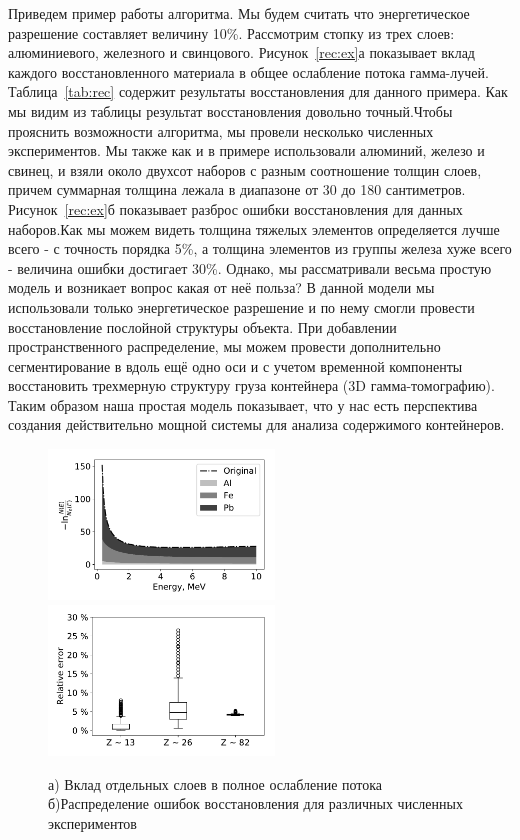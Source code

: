 \documentclass[a4paper]{panl}
\begin{document}
Приведем пример работы алгоритма. Мы будем считать что энергетическое разрешение составляет величину 10\%. Рассмотрим стопку из трех слоев: алюминиевого, железного и свинцового. Рисунок~\ref{rec:ex}а показывает вклад каждого восстановленного материала в общее ослабление потока гамма-лучей. Таблица~\ref{tab:rec} содержит результаты восстановления для данного примера. Как мы видим из таблицы результат восстановления довольно точный.Чтобы прояснить возможности алгоритма, мы провели несколько численных экспериментов. Мы также как и в примере использовали алюминий, железо и свинец, и взяли около двухсот наборов с разным соотношение толщин слоев, причем суммарная толщина лежала в диапазоне от 30 до 180 сантиметров. Рисунок~\ref{rec:ex}б показывает разброс ошибки восстановления для данных наборов.Как мы можем видеть толщина тяжелых элементов определяется лучше всего - с точность порядка 5\%, а толщина элементов из группы железа хуже всего - величина ошибки достигает 30\%. Однако, мы рассматривали весьма простую модель и возникает вопрос какая от неё польза? В данной модели мы использовали только энергетическое разрешение и по нему смогли провести восстановление послойной структуры объекта. При добавлении пространственного распределение, мы можем провести дополнительно сегментирование в вдоль ещё одно оси и с учетом временной компоненты восстановить трехмерную структуру груза контейнера (3D гамма-томографию). Таким образом наша простая модель показывает, что у нас есть перспектива создания действительно мощной системы для анализа содержимого контейнеров.
\begin{figure}[t]
    \begin{center}
        \includegraphics[width=60mm]{figures/reconstruction.pdf} 
        \includegraphics[width=60mm]{figures/relError.pdf}  
        \vspace{-3mm}
        \caption{а) Вклад отдельных слоев в полное ослабление потока б)Распределение ошибок восстановления для различных численных экспериментов}
    \end{center}
    \vspace{-5mm}
\end{figure}
\end{document}
